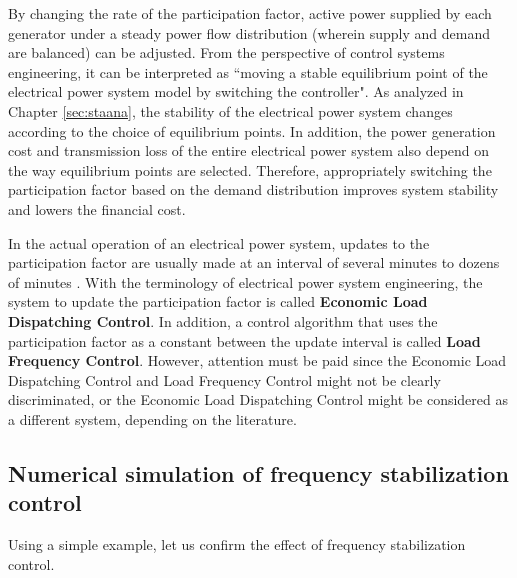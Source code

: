 \documentclass[tombow,dvipdfmx]{corona-a5-1.1}
\begin{document}
By changing the rate of the participation factor, active power supplied by each generator under a steady power flow distribution (wherein supply and demand are balanced) can be adjusted.
From the perspective of control systems engineering, it can be interpreted as “moving a stable equilibrium point of the electrical power system model by switching the controller".
As analyzed in Chapter \ref{sec:staana}, the stability of the electrical power system changes according to the choice of equilibrium points.
In addition, the power generation cost and transmission loss of the entire electrical power system also depend on the way equilibrium points are selected.
Therefore, appropriately switching the participation factor based on the demand distribution improves system stability and lowers the financial cost. 

In the actual operation of an electrical power system, updates to the participation factor are usually made at an interval of several minutes to dozens of minutes \cite[Section 11.1]{kundur1994power}.
With the terminology of electrical power system engineering, the system to update the participation factor is called \textbf{Economic Load Dispatching Control}.
In addition, a control algorithm that uses the participation factor as a constant between the update interval is called \textbf{Load Frequency Control}.
However, attention must be paid since the Economic Load Dispatching Control and Load Frequency Control might not be clearly discriminated, or the Economic Load Dispatching Control might be considered as a different system, depending on the literature. 


\subsection{Numerical simulation of frequency stabilization control}

Using a simple example, let us confirm the effect of frequency stabilization control.
\end{document}
